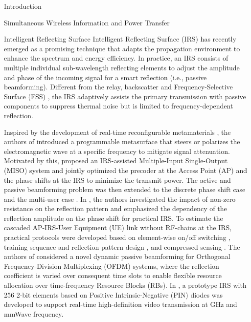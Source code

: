 \documentclass[journal]{IEEEtran}
\begin{document}
\begin{section}{Introduction}
\begin{subsection}{Simultaneous Wireless Information and Power Transfer}
		\end{subsection}


		\begin{subsection}{Intelligent Reflecting Surface}
			Intelligent Reflecting Surface (IRS) has recently emerged as a promising technique that adapts the propagation environment to enhance the spectrum and energy efficiency. In practice, an IRS consists of multiple individual sub-wavelength reflecting elements to adjust the amplitude and phase of the incoming signal for a smart reflection (i.e., passive beamforming). Different from the relay, backscatter and Frequency-Selective Surface (FSS) \cite{Anwar2018}, the IRS adaptively assists the primary transmission with passive components to suppress thermal noise but is limited to frequency-dependent reflection.

			Inspired by the development of real-time reconfigurable metamaterials \cite{Cui2014}, the authors of \cite{Liaskos2018} introduced a programmable metasurface that steers or polarizes the electromagnetic wave at a specific frequency to mitigate signal attenuation. Motivated by this, \cite{Wu2018} proposed an IRS-assisted Multiple-Input Single-Output (MISO) system and jointly optimized the precoder at the Access Point (AP) and the phase shifts at the IRS to minimize the transmit power. The active and passive beamforming problem was then extended to the discrete phase shift case \cite{Wu2019a} and the multi-user case \cite{Wu2019}. In \cite{Abeywickrama2020}, the authors investigated the impact of non-zero resistance on the reflection pattern and emphasized the dependency of the reflection amplitude on the phase shift for practical IRS. To estimate the cascaded AP-IRS-User Equipment (UE) link without RF-chains at the IRS, practical protocols were developed based on element-wise on/off switching \cite{Nadeem2019}, training sequence and reflection pattern design \cite{You2019,Kang2020}, and compressed sensing \cite{Wang2020}. The authors of \cite{Yang2020} considered a novel dynamic passive beamforming for Orthogonal Frequency-Division Multiplexing (OFDM) systems, where the reflection coefficient is varied over consequent time slots to enable flexible resource allocation over time-frequency Resource Blocks (RBs). In \cite{Dai2020}, a prototype IRS with \num{256} \num{2}-bit elements based on Positive Intrinsic-Negative (PIN) diodes was developed to support real-time high-definition video transmission at \si{GHz} and mmWave frequency.
		\end{subsection}



\end{section}
\end{document}
